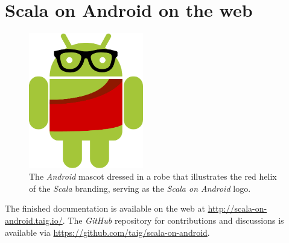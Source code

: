 \section{Scala on Android on the web}

\begin{figure}
	\centering
		\includegraphics[width=5cm]{asset/logo.pdf}
		\caption{The \textit{Android} mascot dressed in a robe that illustrates the red helix of the \textit{Scala} branding, serving as the \textit{Scala on Android} logo.}
\end{figure}

The finished documentation is available on the web at \url{http://scala-on-android.taig.io/}. The \textit{GitHub} repository for contributions and discussions is available via \url{https://github.com/taig/scala-on-android}. 